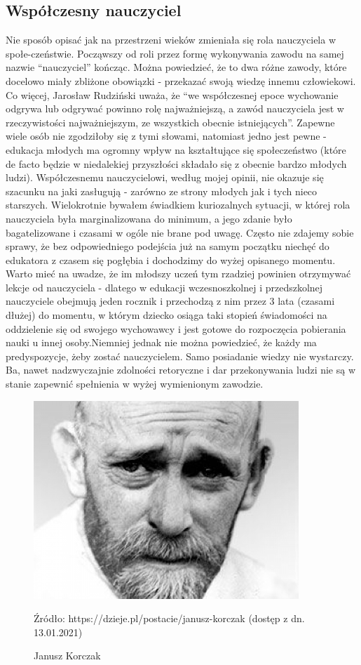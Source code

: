 \documentclass{article}
\begin{document}
	\subsection{Współczesny nauczyciel}
	
	Nie sposób opisać jak na przestrzeni wieków zmieniała się rola nauczyciela w społe-czeństwie. Począwszy od roli przez formę wykonywania zawodu na samej nazwie “nauczyciel” kończąc. Można powiedzieć, że to dwa różne zawody, które docelowo miały zbliżone obowiązki - przekazać swoją wiedzę innemu człowiekowi. Co więcej, Jarosław Rudziński uważa, że “we współczesnej epoce wychowanie odgrywa lub odgrywać powinno rolę najważniejszą, a zawód nauczyciela jest w rzeczywistości najważniejszym, ze wszystkich obecnie istniejących”. Zapewne wiele osób nie zgodziłoby się z tymi słowami, natomiast jedno jest pewne - edukacja młodych ma ogromny wpływ na kształtujące się społeczeństwo (które de facto będzie w niedalekiej przyszłości składało się z obecnie bardzo młodych ludzi). Współczesnemu nauczycielowi, według mojej opinii, nie okazuje się szacunku na jaki zasługują - zarówno ze strony młodych jak i tych nieco starszych. Wielokrotnie bywałem świadkiem kuriozalnych sytuacji, w której rola nauczyciela była marginalizowana do minimum, a jego zdanie było bagatelizowane i czasami w ogóle nie brane pod uwagę. Często nie zdajemy sobie sprawy, że bez odpowiedniego podejścia już na samym początku niechęć do edukatora z czasem się pogłębia i dochodzimy do wyżej opisanego momentu. Warto mieć na uwadze, że im młodszy uczeń tym rzadziej powinien otrzymywać lekcje od nauczyciela - dlatego w edukacji wczesnoszkolnej i przedszkolnej nauczyciele obejmują jeden rocznik i przechodzą z nim przez 3 lata (czasami dłużej) do momentu, w którym dziecko osiąga taki stopień świadomości na oddzielenie się od swojego wychowawcy i jest gotowe do rozpoczęcia pobierania nauki u innej osoby.Niemniej jednak nie można powiedzieć, że każdy ma predyspozycje, żeby zostać nauczycielem. Samo posiadanie wiedzy nie wystarczy. Ba, nawet nadzwyczajnie zdolności retoryczne i dar przekonywania ludzi nie są w stanie zapewnić spełnienia w wyżej wymienionym zawodzie. 
	\begin{figure}
		\centering
		\includegraphics[width=10cm]{korczak}
		\caption{Janusz Korczak}
		Źródło: https://dzieje.pl/postacie/janusz-korczak (dostęp z dn. 13.01.2021)
	\end{figure}
\end{document}
